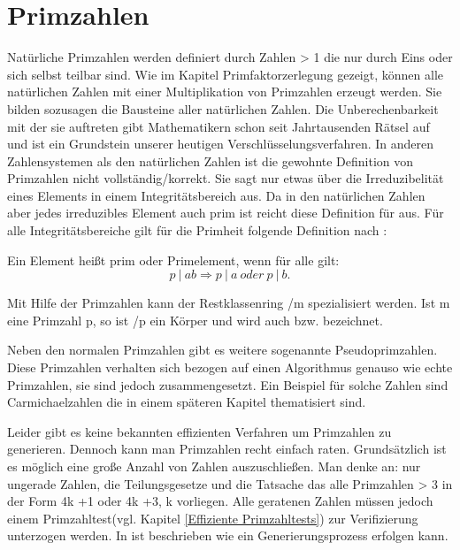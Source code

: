 \section{Primzahlen}\label{Kapitel Primzahlen}
	Natürliche Primzahlen werden definiert durch Zahlen > 1 die nur durch Eins oder sich selbst teilbar sind. Wie im Kapitel Primfaktorzerlegung gezeigt, können alle natürlichen Zahlen mit einer Multiplikation von Primzahlen erzeugt werden. Sie bilden sozusagen die Bausteine aller natürlichen Zahlen. Die Unberechenbarkeit mit der sie auftreten gibt Mathematikern schon seit Jahrtausenden Rätsel auf und ist ein Grundstein unserer heutigen Verschlüsselungsverfahren.
	In anderen Zahlensystemen als den natürlichen Zahlen ist die gewohnte Definition von Primzahlen nicht vollständig/korrekt. Sie sagt nur etwas über die Irreduzibelität eines Elements in einem Integritätsbereich aus. Da in den natürlichen Zahlen aber jedes irreduzibles Element auch prim ist reicht diese Definition für  aus.
	Für alle Integritätsbereiche gilt für die Primheit folgende Definition nach \cite{Algorithmische:Zahlentheorie}:
	
	Ein Element  heißt prim oder Primelement, wenn für alle  gilt:	
	\begin{displaymath}
		p~|~ab \Longrightarrow p~|~a~oder~p~|~b.
	\end{displaymath}
		
	Mit Hilfe der Primzahlen kann der Restklassenring /m spezialisiert werden. Ist m eine Primzahl p, so ist /p ein Körper und wird auch  bzw.  bezeichnet.
	
	Neben den normalen Primzahlen gibt es weitere sogenannte Pseudoprimzahlen. Diese Primzahlen verhalten sich bezogen auf einen Algorithmus genauso wie echte Primzahlen, sie sind jedoch zusammengesetzt. Ein Beispiel für solche Zahlen sind Carmichaelzahlen die in einem späteren Kapitel thematisiert sind.

	Leider gibt es keine bekannten effizienten Verfahren um Primzahlen zu generieren. Dennoch kann man Primzahlen recht einfach raten. Grundsätzlich ist es möglich eine große Anzahl von Zahlen auszuschließen. Man denke an: nur ungerade Zahlen, die Teilungsgesetze und die Tatsache das alle Primzahlen > 3 in der Form 4k +1 oder 4k +3, k \myin {} vorliegen. Alle geratenen Zahlen müssen jedoch einem Primzahltest(vgl. Kapitel \ref{Effiziente Primzahltests}) zur Verifizierung unterzogen werden. In \cite{Algebraische:und:zahlentheoretische:Grundlagen:fuer:die:Informatik} ist beschrieben wie ein Generierungsprozess erfolgen kann.

